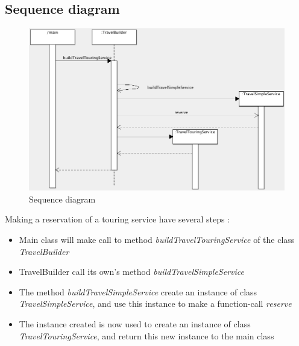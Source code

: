 \subsection{Sequence diagram}

\begin{figure}[h]
\centering
\includegraphics[width=16cm]{project/images/sequence.png}
\caption{Sequence diagram}
\end{figure}

Making a reservation of a touring service have several steps :
\begin{itemize}
\item Main class will make call to method \textit{buildTravelTouringService} of the class \textit{TravelBuilder}
\item TravelBuilder call its own's method \textit{buildTravelSimpleService} 
\item The method \textit{buildTravelSimpleService} create an instance of class \textit{TravelSimpleService}, and use this instance to make a function-call \textit{reserve}
\item The instance created is now used to create an instance of class \textit{TravelTouringService}, and return this new instance to the main class
\end{itemize}